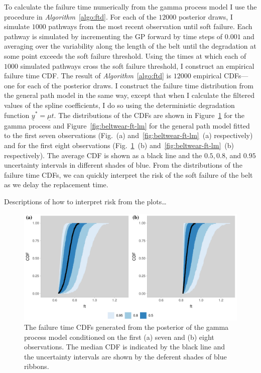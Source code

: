 To calculate the failure time numerically from the gamma process model I use the procedure in \textit{Algorithm}~\ref{algo:ftd}. For each of the $12000$ posterior draws, I simulate $1000$ pathways from the most recent observation until soft failure. Each pathway is simulated by incrementing the GP forward by time steps of $0.001$ and averaging over the variability along the length of the belt until the degradation at some point exceeds the soft failure threshold. Using the times at which each of $1000$ simulated pathways cross the soft failure threshold, I construct an empirical failure time CDF. The result of \textit{Algorithm}~\ref{algo:ftd} is $12000$ empirical CDFs---one for each of the posterior draws. I construct the failure time distribution from the general path model in the same way, except that when I calculate the filtered values of the spline coefficients, I do so using the deterministic degradation function $\underline{y}^* = \underline{\mu} t$. The distributions of the CDFs are shown in Figure~\ref{fig:beltwear-ft-gp} for the gamma process and Figure~\ref{fig:beltwear-ft-lm} for the general path model fitted to the first seven observations (Fig.~(a) and~\ref{fig:beltwear-ft-lm}~(a) respectively) and for the first eight observations (Fig.~\ref{fig:beltwear-ft-gp}~(b) and~\ref{fig:beltwear-ft-lm}~(b) respectively). The average CDF is shown as a black line and the $0.5, 0.8$, and $0.95$ uncertainty intervals in different shades of blue. From the distributions of the failure time CDFs, we can quickly interpret the risk of the soft failure of the belt as we delay the replacement time.

Descriptions of how to interpret risk from the plots\ldots

\begin{figure}
  \centering
  \includegraphics[width=\textwidth]{figures/ch-6/belt_wear_failuretime_CDF_gp.pdf}
  \caption{The failure time CDFs generated from the posterior of the gamma process model conditioned on the first (a) seven and (b) eight observations. The median CDF is indicated by the black line and the uncertainty intervals are shown by the deferent shades of blue ribbons.}
  \label{fig:beltwear-ft-gp}
\end{figure}

